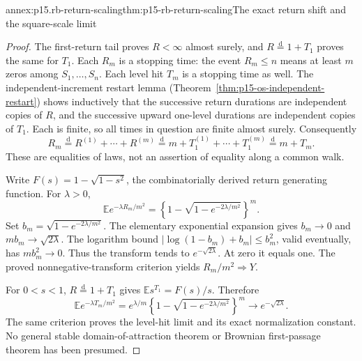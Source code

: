 \begin{annexitem}{annex:p15.rb-return-scaling}{thm:p15-rb-return-scaling}{The exact return shift and the square-scale limit}
\begin{proof}
The first-return tail proves \(R<\infty\) almost surely, and
\(R\stackrel{\mathrm d}=1+T_1\) proves the same for \(T_1\).
Each \(R_m\) is a stopping time: the event \(R_m\leq n\)
means at least \(m\) zeros among \(S_1,\ldots,S_n\).
Each level hit \(T_m\) is a stopping time as well.
The independent-increment restart lemma
(Theorem~\ref{thm:p15-os-independent-restart}) shows inductively
that the successive return durations are independent copies of \(R\),
and the successive upward one-level durations are independent
copies of \(T_1\). Each is finite, so all times in question
are finite almost surely.
Consequently
\[
 R_m\stackrel{\mathrm d}=R^{(1)}+\cdots+R^{(m)}
 \stackrel{\mathrm d}=m+T_1^{(1)}+\cdots+T_1^{(m)}
 \stackrel{\mathrm d}=m+T_m.
 \]
These are equalities of laws, not an assertion of equality
along a common walk.

Write \(F(s)=1-\sqrt{1-s^2}\), the combinatorially derived
return generating function. For \(\lambda>0\),
\[
 \mathbb Ee^{-\lambda R_m/m^2}
 =\left\{1-\sqrt{1-e^{-2\lambda/m^2}}\right\}^{m}.
 \]
Set \(b_m=\sqrt{1-e^{-2\lambda/m^2}}\).
The elementary exponential expansion gives
\(b_m\to0\) and \(mb_m\to\sqrt{2\lambda}\).
The logarithm bound
\(|\log(1-b_m)+b_m|\leq b_m^2\), valid eventually,
has \(mb_m^2\to0\). Thus the transform tends to
\(e^{-\sqrt{2\lambda}}\). At zero it equals one.
The proved nonnegative-transform criterion yields
\(R_m/m^2\Rightarrow Y\).

For \(0<s<1\), \(R\stackrel{\mathrm d}=1+T_1\) gives
\(\mathbb Es^{T_1}=F(s)/s\).
Therefore
\[
 \mathbb Ee^{-\lambda T_m/m^2}
 =e^{\lambda/m}
    \left\{1-\sqrt{1-e^{-2\lambda/m^2}}\right\}^{m}
 \longrightarrow e^{-\sqrt{2\lambda}}.
 \]
The same criterion proves the level-hit limit and its exact
normalization constant. No general stable domain-of-attraction
theorem or Brownian first-passage theorem has been presumed.
\end{proof}
\end{annexitem}

